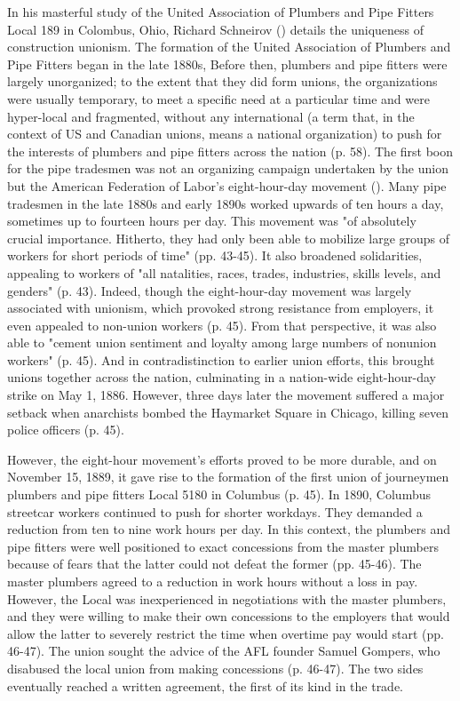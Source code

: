 \documentclass[12pt]{article}
\begin{document}
In his masterful study of the United Association of Plumbers and Pipe Fitters Local 189 in Colombus, Ohio, Richard Schneirov (\citeyear{schneirovPrideSolidarityHistory1993}) details the uniqueness of construction unionism. The formation of the United Association of Plumbers and Pipe Fitters began in the late 1880s, Before then, plumbers and pipe fitters were largely unorganized; to the extent that they did form unions, the organizations were usually temporary, to meet a specific need at a particular time and were hyper-local and fragmented, without any international (a term that, in the context of US and Canadian unions, means a national organization) to push for the interests of plumbers and pipe fitters across the nation (p. 58). The first boon for the pipe tradesmen was not an organizing campaign undertaken by the union but the American Federation of Labor’s eight-hour-day movement (\citeyear[11, 43-45]{schneirovPrideSolidarityHistory1993}). Many pipe tradesmen in the late 1880s and early 1890s worked upwards of ten hours a day, sometimes up to fourteen hours per day. This movement was "of absolutely crucial importance. Hitherto, they had only been able to mobilize large groups of workers for short periods of time" (pp. 43-45). It also broadened solidarities, appealing to workers of "all natalities, races, trades, industries, skills levels, and genders" (p. 43). Indeed, though the eight-hour-day movement was largely associated with unionism, which provoked strong resistance from employers, it even appealed to non-union workers (p. 45). From that perspective, it was also able to "cement union sentiment and loyalty among large numbers of nonunion workers" (p. 45). And in contradistinction to earlier union efforts, this brought unions together across the nation, culminating in a nation-wide eight-hour-day strike on May 1, 1886. However, three days later the movement suffered a major setback when anarchists bombed the Haymarket Square in Chicago, killing seven police officers (p. 45).

However, the eight-hour movement’s efforts proved to be more durable, and on November 15, 1889, it gave rise to the formation of the first union of journeymen plumbers and pipe fitters Local 5180 in Columbus (p. 45). In 1890, Columbus streetcar workers continued to push for shorter workdays. They demanded a reduction from ten to nine work hours per day. In this context, the plumbers and pipe fitters were well positioned to exact concessions from the master plumbers because of fears that the latter could not defeat the former (pp. 45-46). The master plumbers agreed to a reduction in work hours without a loss in pay. However, the Local was inexperienced in negotiations with the master plumbers, and they were willing to make their own concessions to the employers that would allow the latter to severely restrict the time when overtime pay would start (pp. 46-47). The union sought the advice of the AFL founder Samuel Gompers, who disabused the local union from making concessions (p. 46-47). The two sides eventually reached a written agreement, the first of its kind in the trade. 
\end{document}
